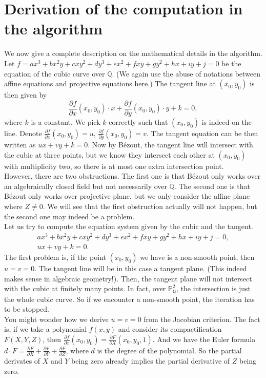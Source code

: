 \documentclass[a4paper,oneside,11pt]{article}
\newcommand{\bP}{\mathbb{P}}
\newcommand{\bQ}{\mathbb{Q}}
\theoremstyle{definition}
\begin{document}
\section{Derivation of the computation in the algorithm}
We now give a complete description on the mathematical details in the algorithm.\\
Let $f=ax^3+bx^2y+cxy^2+dy^3+ex^2+fxy+gy^2+hx+iy+j=0$ be the equation of the cubic curve over $\bQ$. (We again use the abuse of notations between affine equations and projective equations here.) The tangent line at $(x_0,y_0)$ is then given by
\[
	\frac{\partial f}{\partial x}(x_0,y_0) \cdot x + \frac{\partial f}{\partial y}(x_0,y_0) \cdot y + k = 0,
\]
where $k$ is a constant. We pick $k$ correctly such that $(x_0,y_0)$ is indeed on the line. Denote $\frac{\partial f}{\partial x}(x_0,y_0) = u$, $\frac{\partial f}{\partial y}(x_0,y_0) = v$. The tangent equation can be then written as $ux+vy+k=0$. Now by B\'ezout, the tangent line will intersect with the cubic at three points, but we know they intersect each other at $(x_0,y_0)$ with multiplicity two, so there is at most one extra intersection point.\\
However, there are two obstructions. The first one is that B\'ezout only works over an algebraically closed field but not necessarily over $\bQ$. The second one is that B\'ezout only works over projective plane, but we only consider the affine plane where $Z\neq 0$. We will see that the first obstruction actually will not happen, but the second one may indeed be a problem.\\
Let us try to compute the equation system given by the cubic and the tangent.
\begin{align*}
	ax^3+bx^2y+cxy^2+dy^3+ex^2+fxy+gy^2+hx+iy+j=0,\\
	ux+vy+k=0.
\end{align*}
The first problem is, if the point $(x_0,y_0)$ we have is a non-smooth point, then $u=v=0$. The tangent line will be in this case a tangent plane. (This indeed makes sense in algebraic geometry!). Then, the tangent plane will not intersect with the cubic at finitely many points. In fact, over $\bP^2_\bQ$, the intersection is just the whole cubic curve. So if we encounter a non-smooth point, the iteration has to be stopped.\\
You might wonder how we derive $u=v=0$ from the Jacobian criterion. The fact is, if we take a polynomial $f(x,y)$ and consider its compactification $F(X,Y,Z)$, then $\frac{\partial f}{\partial x}(x_0,y_0)=\frac{\partial F}{\partial X}(x_0,y_0,1)$. And we have the Euler formula $d\cdot F=\frac{\partial F}{\partial X}+\frac{\partial F}{\partial Y}+\frac{\partial F}{\partial Z}$, where $d$ is the degree of the polynomial. So the partial derivates of $X$ and $Y$ being zero already implies the partial derivative of $Z$ being zero.\\
\end{document}
